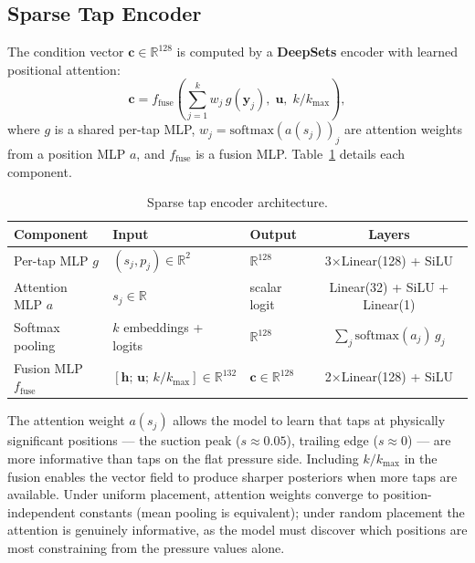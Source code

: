 \documentclass[12pt]{article}
\begin{document}
\subsection{Sparse Tap Encoder}

The condition vector $\mathbf{c} \in \mathbb{R}^{128}$ is computed by a
\textbf{DeepSets} encoder with learned positional attention:
\begin{equation}
    \mathbf{c} = f_\mathrm{fuse}\!\left(\textstyle\sum_{j=1}^k w_j\, g(\mathbf{y}_j),\;\mathbf{u},\; k/k_\mathrm{max}\right),
    \label{eq:encoder}
\end{equation}
where $g$ is a shared per-tap MLP, $w_j = \mathrm{softmax}(a(s_j))_j$ are
attention weights from a position MLP $a$, and $f_\mathrm{fuse}$ is a fusion
MLP. Table~\ref{tab:encoder} details each component.

\begin{table}[ht]
\centering
\caption{Sparse tap encoder architecture.}
\label{tab:encoder}
\begin{tabular}{lllc}
\toprule
Component & Input & Output & Layers \\
\midrule
Per-tap MLP $g$ & $(s_j, p_j) \in \mathbb{R}^2$ & $\mathbb{R}^{128}$ & 3$\times$Linear(128) + SiLU \\
Attention MLP $a$ & $s_j \in \mathbb{R}$ & scalar logit & Linear(32) + SiLU + Linear(1) \\
Softmax pooling & $k$ embeddings + logits & $\mathbb{R}^{128}$ & $\sum_j \mathrm{softmax}(a_j)\, g_j$ \\
Fusion MLP $f_\mathrm{fuse}$ & $[\mathbf{h};\,\mathbf{u};\,k/k_\mathrm{max}] \in \mathbb{R}^{132}$ & $\mathbf{c} \in \mathbb{R}^{128}$ & 2$\times$Linear(128) + SiLU \\
\bottomrule
\end{tabular}
\end{table}

The attention weight $a(s_j)$ allows the model to learn that taps at physically
significant positions — the suction peak ($s \approx 0.05$), trailing edge
($s \approx 0$) — are more informative than taps on the flat pressure side.
Including $k/k_\mathrm{max}$ in the fusion enables the vector field to produce
sharper posteriors when more taps are available. Under uniform placement,
attention weights converge to position-independent constants (mean pooling is
equivalent); under random placement the attention is genuinely informative, as
the model must discover which positions are most constraining from the pressure
values alone.
\end{document}
